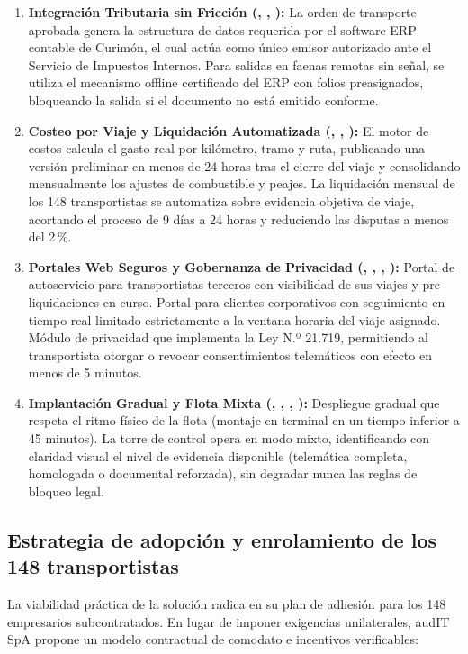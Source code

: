 \begin{enumerate}
  \item \textbf{Integración Tributaria sin Fricción (, , ):} La orden de transporte
  aprobada genera la estructura de datos requerida por el software ERP contable de Curimón, el cual actúa como único emisor
  autorizado ante el Servicio de Impuestos Internos. Para salidas en faenas remotas sin señal, se utiliza el mecanismo
  offline certificado del ERP con folios preasignados, bloqueando la salida si el documento no está emitido conforme.
  \item \textbf{Costeo por Viaje y Liquidación Automatizada (, , ):} El motor de costos
  calcula el gasto real por kilómetro, tramo y ruta, publicando una versión preliminar en menos de 24 horas tras el cierre
  del viaje y consolidando mensualmente los ajustes de combustible y peajes. La liquidación mensual de los 148 transportistas
  se automatiza sobre evidencia objetiva de viaje, acortando el proceso de 9 días a 24 horas y reduciendo las disputas a menos del 2\,\%.
  \item \textbf{Portales Web Seguros y Gobernanza de Privacidad (, , , ):}
  Portal de autoservicio para transportistas terceros con visibilidad de sus viajes y pre-liquidaciones en curso. Portal para
  clientes corporativos con seguimiento en tiempo real limitado estrictamente a la ventana horaria del viaje asignado. Módulo
  de privacidad que implementa la Ley N.º 21.719, permitiendo al transportista otorgar o revocar consentimientos telemáticos
  con efecto en menos de 5 minutos.
  \item \textbf{Implantación Gradual y Flota Mixta (, , , ):}
  Despliegue gradual que respeta el ritmo físico de la flota (montaje en terminal en un tiempo inferior a 45 minutos).
  La torre de control opera en modo mixto, identificando con claridad visual el nivel de evidencia disponible (telemática
  completa, homologada o documental reforzada), sin degradar nunca las reglas de bloqueo legal.
\end{enumerate}

\subsection{Estrategia de adopción y enrolamiento de los 148 transportistas}\label{sec:3-adopcion-transportistas}

La viabilidad práctica de la solución radica en su plan de adhesión para los 148 empresarios subcontratados. En lugar de
imponer exigencias unilaterales, audIT SpA propone un modelo contractual de comodato e incentivos verificables:

